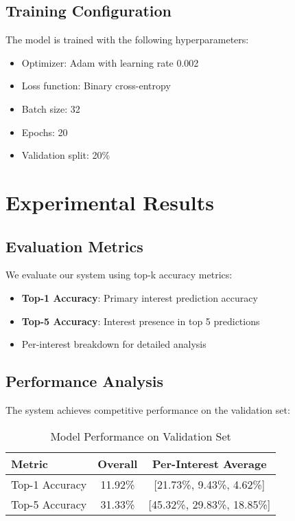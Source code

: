 \documentclass[preprint,12pt]{elsarticle}
\begin{document}
\subsection{Training Configuration}
The model is trained with the following hyperparameters:
\begin{itemize}
    \item Optimizer: Adam with learning rate 0.002
    \item Loss function: Binary cross-entropy
    \item Batch size: 32
    \item Epochs: 20
    \item Validation split: 20\%
\end{itemize}

\section{Experimental Results}
\label{sec4}

\subsection{Evaluation Metrics}
We evaluate our system using top-k accuracy metrics:
\begin{itemize}
    \item \textbf{Top-1 Accuracy}: Primary interest prediction accuracy
    \item \textbf{Top-5 Accuracy}: Interest presence in top 5 predictions
    \item Per-interest breakdown for detailed analysis
\end{itemize}

\subsection{Performance Analysis}
The system achieves competitive performance on the validation set:

\begin{table}[h]
\centering
\begin{tabular}{l c c}
\hline
Metric & Overall & Per-Interest Average \\
\hline
Top-1 Accuracy & 11.92\% & [21.73\%, 9.43\%, 4.62\%] \\
Top-5 Accuracy & 31.33\% & [45.32\%, 29.83\%, 18.85\%] \\
\hline
\end{tabular}
\caption{Model Performance on Validation Set}
\label{tab1}
\end{table}
\end{document}
